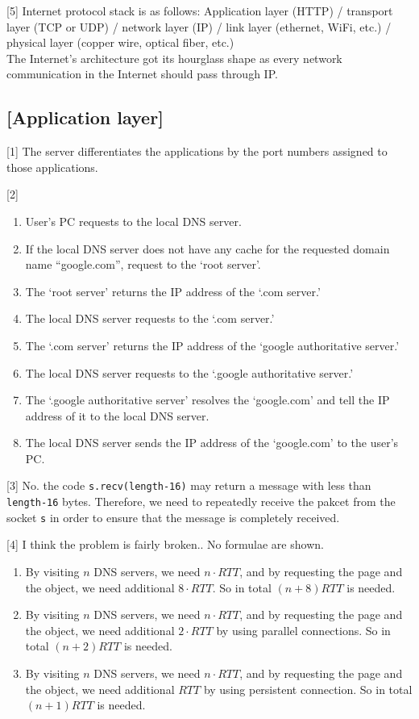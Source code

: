 \documentclass{homework}
\begin{document}
[5] Internet protocol stack is as follows:
Application layer (HTTP) / transport layer (TCP or UDP) / network layer (IP) / link layer (ethernet, WiFi, etc.) / physical layer (copper wire, optical fiber, etc.)\\
The Internet's architecture got its hourglass shape as every network communication in the Internet should pass through IP.

\subsection*{[Application layer]}

[1] The server differentiates the applications by the port numbers assigned to those applications.

[2] \begin{enumerate}
\item User's PC requests to the local DNS server.
\item If the local DNS server does not have any cache for the requested domain name ``google.com'', request to the `root server'.
\item The `root server' returns the IP address of the `.com server.'
\item The local DNS server requests to the `.com server.'
\item The `.com server' returns the IP address of the `google authoritative server.'
\item The local DNS server requests to the `.google authoritative server.'
\item The `.google authoritative server' resolves the `google.com' and tell the IP address of it to the local DNS server.
\item The local DNS server sends the IP address of the `google.com' to the user's PC.
\end{enumerate}

[3] No. the code \verb|s.recv(length-16)| may return a message with less than \texttt{length-16} bytes. Therefore, we need to repeatedly receive the pakcet from the socket \texttt{s} in order to ensure that the message is completely received.

[4] I think the problem is fairly broken.. No formulae are shown.
\begin{enumerate}[label={\arabic*)}]
  \item By visiting $n$ DNS servers, we need $n\cdot RTT$, and by requesting the page and the object, we need additional $8\cdot RTT$. So in total $(n+8)RTT$ is needed.
  \item By visiting $n$ DNS servers, we need $n\cdot RTT$, and by requesting the page and the object, we need additional $2\cdot RTT$ by using parallel connections. So in total $(n+2)RTT$ is needed.
  \item By visiting $n$ DNS servers, we need $n\cdot RTT$, and by requesting the page and the object, we need additional $RTT$ by using persistent connection. So in total $(n+1)RTT$ is needed.
\end{enumerate}
\end{document}
